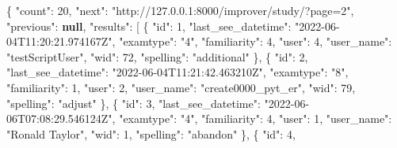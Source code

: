 \documentclass[
]{article}
\newenvironment{Shaded}{}{}
\newcommand{\DataTypeTok}[1]{\textcolor[rgb]{0.56,0.13,0.00}{#1}}
\newcommand{\DecValTok}[1]{\textcolor[rgb]{0.25,0.63,0.44}{#1}}
\newcommand{\FunctionTok}[1]{\textcolor[rgb]{0.02,0.16,0.49}{#1}}
\newcommand{\KeywordTok}[1]{\textcolor[rgb]{0.00,0.44,0.13}{\textbf{#1}}}
\newcommand{\OtherTok}[1]{\textcolor[rgb]{0.00,0.44,0.13}{#1}}
\newcommand{\StringTok}[1]{\textcolor[rgb]{0.25,0.44,0.63}{#1}}
\begin{document}
\begin{Shaded}
\begin{Highlighting}[]
\FunctionTok{\{}
  \DataTypeTok{"count"}\FunctionTok{:} \DecValTok{20}\FunctionTok{,}
  \DataTypeTok{"next"}\FunctionTok{:} \StringTok{"http://127.0.0.1:8000/improver/study/?page=2"}\FunctionTok{,}
  \DataTypeTok{"previous"}\FunctionTok{:} \KeywordTok{null}\FunctionTok{,}
  \DataTypeTok{"results"}\FunctionTok{:} \OtherTok{[}
    \FunctionTok{\{}
      \DataTypeTok{"id"}\FunctionTok{:} \DecValTok{1}\FunctionTok{,}
      \DataTypeTok{"last\_see\_datetime"}\FunctionTok{:} \StringTok{"2022{-}06{-}04T11:20:21.974167Z"}\FunctionTok{,}
      \DataTypeTok{"examtype"}\FunctionTok{:} \StringTok{"4"}\FunctionTok{,}
      \DataTypeTok{"familiarity"}\FunctionTok{:} \DecValTok{4}\FunctionTok{,}
      \DataTypeTok{"user"}\FunctionTok{:} \DecValTok{4}\FunctionTok{,}
      \DataTypeTok{"user\_name"}\FunctionTok{:} \StringTok{"testScriptUser"}\FunctionTok{,}
      \DataTypeTok{"wid"}\FunctionTok{:} \DecValTok{72}\FunctionTok{,}
      \DataTypeTok{"spelling"}\FunctionTok{:} \StringTok{"additional"}
    \FunctionTok{\}}\OtherTok{,}
    \FunctionTok{\{}
      \DataTypeTok{"id"}\FunctionTok{:} \DecValTok{2}\FunctionTok{,}
      \DataTypeTok{"last\_see\_datetime"}\FunctionTok{:} \StringTok{"2022{-}06{-}04T11:21:42.463210Z"}\FunctionTok{,}
      \DataTypeTok{"examtype"}\FunctionTok{:} \StringTok{"8"}\FunctionTok{,}
      \DataTypeTok{"familiarity"}\FunctionTok{:} \DecValTok{1}\FunctionTok{,}
      \DataTypeTok{"user"}\FunctionTok{:} \DecValTok{2}\FunctionTok{,}
      \DataTypeTok{"user\_name"}\FunctionTok{:} \StringTok{"create0000\_pyt\_er"}\FunctionTok{,}
      \DataTypeTok{"wid"}\FunctionTok{:} \DecValTok{79}\FunctionTok{,}
      \DataTypeTok{"spelling"}\FunctionTok{:} \StringTok{"adjust"}
    \FunctionTok{\}}\OtherTok{,}
    \FunctionTok{\{}
      \DataTypeTok{"id"}\FunctionTok{:} \DecValTok{3}\FunctionTok{,}
      \DataTypeTok{"last\_see\_datetime"}\FunctionTok{:} \StringTok{"2022{-}06{-}06T07:08:29.546124Z"}\FunctionTok{,}
      \DataTypeTok{"examtype"}\FunctionTok{:} \StringTok{"4"}\FunctionTok{,}
      \DataTypeTok{"familiarity"}\FunctionTok{:} \DecValTok{4}\FunctionTok{,}
      \DataTypeTok{"user"}\FunctionTok{:} \DecValTok{1}\FunctionTok{,}
      \DataTypeTok{"user\_name"}\FunctionTok{:} \StringTok{"Ronald Taylor"}\FunctionTok{,}
      \DataTypeTok{"wid"}\FunctionTok{:} \DecValTok{1}\FunctionTok{,}
      \DataTypeTok{"spelling"}\FunctionTok{:} \StringTok{"abandon"}
    \FunctionTok{\}}\OtherTok{,}
    \FunctionTok{\{}
      \DataTypeTok{"id"}\FunctionTok{:} \DecValTok{4}\FunctionTok{,}

\end{Highlighting}
\end{Shaded}
\end{document}
